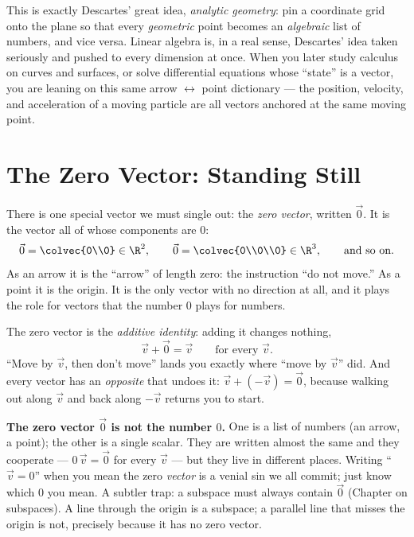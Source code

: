 \begin{connectionbox}
This is exactly Descartes' great idea, \emph{analytic geometry}: pin a coordinate grid
onto the plane so that every \emph{geometric} point becomes an \emph{algebraic} list of
numbers, and vice versa. Linear algebra is, in a real sense, Descartes' idea taken
seriously and pushed to every dimension at once. When you later study calculus on curves
and surfaces, or solve differential equations whose ``state'' is a vector, you are leaning
on this same arrow $\leftrightarrow$ point dictionary --- the position, velocity, and
acceleration of a moving particle are all vectors anchored at the same moving point.
\end{connectionbox}

\section{The Zero Vector: Standing Still}
\label{ch02:zero}

There is one special vector we must single out: the \emph{zero vector}, written $\vec{0}$.
It is the vector all of whose components are $0$:
\[
  \vec{0} = \colvec{0\\0} \in \R^2,\qquad
  \vec{0} = \colvec{0\\0\\0} \in \R^3,\qquad
  \text{and so on.}
\]
As an arrow it is the ``arrow'' of length zero: the instruction ``do not move.'' As a
point it is the origin. It is the only vector with no direction at all, and it plays the
role for vectors that the number $0$ plays for numbers.

\begin{focusbox}
The zero vector is the \emph{additive identity}: adding it changes nothing,
\[
  \vec{v} + \vec{0} = \vec{v}\qquad\text{for every }\vec{v}.
\]
``Move by $\vec{v}$, then don't move'' lands you exactly where ``move by $\vec{v}$'' did.
And every vector has an \emph{opposite} that undoes it: $\vec{v} + (-\vec{v}) = \vec{0}$,
because walking out along $\vec{v}$ and back along $-\vec{v}$ returns you to start.
\end{focusbox}

\begin{trapbox}
\textbf{The zero vector $\vec{0}$ is not the number $0$.} One is a list of numbers (an
arrow, a point); the other is a single scalar. They are written almost the same and they
cooperate --- $0\,\vec{v}=\vec{0}$ for every $\vec{v}$ --- but they live in different
places. Writing ``$\vec{v}=0$'' when you mean the zero \emph{vector} is a venial sin we
all commit; just know which $0$ you mean. A subtler trap: a subspace must always contain
$\vec{0}$ (Chapter on subspaces). A line through the origin is a subspace; a parallel line
that misses the origin is not, precisely because it has no zero vector.
\end{trapbox}

